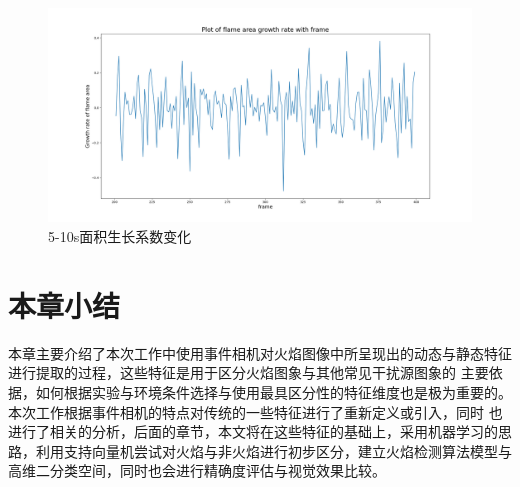 \begin{figure}[ht]
        \centering
        \includegraphics[width=\textwidth]{figures/extract_area_02.png}
        \caption{5-10s面积生长系数变化}
        \label{13}
\end{figure}

\section{本章小结}
本章主要介绍了本次工作中使用事件相机对火焰图像中所呈现出的动态与静态特征进行提取的过程，这些特征是用于区分火焰图象与其他常见干扰源图象的
主要依据，如何根据实验与环境条件选择与使用最具区分性的特征维度也是极为重要的。本次工作根据事件相机的特点对传统的一些特征进行了重新定义或引入，同时
也进行了相关的分析，后面的章节，本文将在这些特征的基础上，采用机器学习的思路，利用支持向量机尝试对火焰与非火焰进行初步区分，建立火焰检测算法模型与高维二分类空间，同时也会进行精确度评估与视觉效果比较。